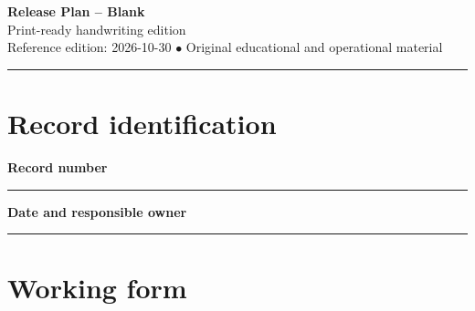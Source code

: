 \documentclass[10pt,letterpaper]{article}
\begin{document}
\begin{center}
{\LARGE\bfseries\color{cdblue}Release Plan -- Blank}\\[7pt]
{\large Print-ready handwriting edition}\\[6pt]
{\small Reference edition: 2026-10-30 $\bullet$ Original educational and operational material}
\end{center}
\noindent\color{cdblue}\rule{\linewidth}{1.2pt}\color{black}
\vspace{0.4em}
\section{Record identification}
\textbf{Record number}\par
\noindent\rule{\linewidth}{0.35pt}\par\vspace{0.7em}
\textbf{Date and responsible owner}\par
\noindent\rule{\linewidth}{0.35pt}\par\vspace{0.7em}

\section{Working form}
\end{document}
